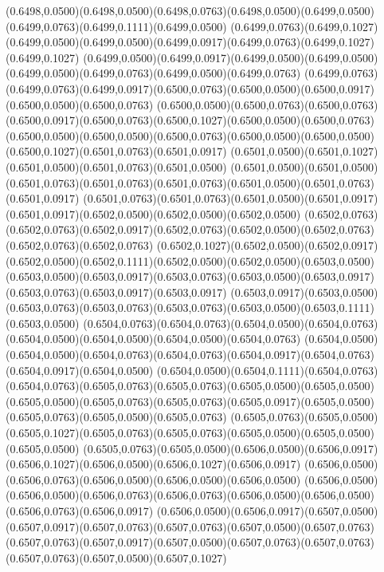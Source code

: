(0.6498,0.0500)(0.6498,0.0500)(0.6498,0.0763)(0.6498,0.0500)(0.6499,0.0500)(0.6499,0.0763)(0.6499,0.1111)(0.6499,0.0500)
(0.6499,0.0763)(0.6499,0.1027)(0.6499,0.0500)(0.6499,0.0500)(0.6499,0.0917)(0.6499,0.0763)(0.6499,0.1027)(0.6499,0.1027)
(0.6499,0.0500)(0.6499,0.0917)(0.6499,0.0500)(0.6499,0.0500)(0.6499,0.0500)(0.6499,0.0763)(0.6499,0.0500)(0.6499,0.0763)
(0.6499,0.0763)(0.6499,0.0763)(0.6499,0.0917)(0.6500,0.0763)(0.6500,0.0500)(0.6500,0.0917)(0.6500,0.0500)(0.6500,0.0763)
(0.6500,0.0500)(0.6500,0.0763)(0.6500,0.0763)(0.6500,0.0917)(0.6500,0.0763)(0.6500,0.1027)(0.6500,0.0500)(0.6500,0.0763)
(0.6500,0.0500)(0.6500,0.0500)(0.6500,0.0763)(0.6500,0.0500)(0.6500,0.0500)(0.6500,0.1027)(0.6501,0.0763)(0.6501,0.0917)
(0.6501,0.0500)(0.6501,0.1027)(0.6501,0.0500)(0.6501,0.0763)(0.6501,0.0500)
\PST@Solid(0.6501,0.0500)(0.6501,0.0500)(0.6501,0.0763)(0.6501,0.0763)(0.6501,0.0763)(0.6501,0.0500)(0.6501,0.0763)(0.6501,0.0917)
(0.6501,0.0763)(0.6501,0.0763)(0.6501,0.0500)(0.6501,0.0917)(0.6501,0.0917)(0.6502,0.0500)(0.6502,0.0500)(0.6502,0.0500)
(0.6502,0.0763)(0.6502,0.0763)(0.6502,0.0917)(0.6502,0.0763)(0.6502,0.0500)(0.6502,0.0763)(0.6502,0.0763)(0.6502,0.0763)
(0.6502,0.1027)(0.6502,0.0500)(0.6502,0.0917)(0.6502,0.0500)(0.6502,0.1111)(0.6502,0.0500)(0.6502,0.0500)(0.6503,0.0500)
(0.6503,0.0500)(0.6503,0.0917)(0.6503,0.0763)(0.6503,0.0500)(0.6503,0.0917)(0.6503,0.0763)(0.6503,0.0917)(0.6503,0.0917)
(0.6503,0.0917)(0.6503,0.0500)(0.6503,0.0763)(0.6503,0.0763)(0.6503,0.0763)(0.6503,0.0500)(0.6503,0.1111)(0.6503,0.0500)
(0.6504,0.0763)(0.6504,0.0763)(0.6504,0.0500)(0.6504,0.0763)(0.6504,0.0500)(0.6504,0.0500)(0.6504,0.0500)(0.6504,0.0763)
(0.6504,0.0500)(0.6504,0.0500)(0.6504,0.0763)(0.6504,0.0763)(0.6504,0.0917)(0.6504,0.0763)(0.6504,0.0917)(0.6504,0.0500)
(0.6504,0.0500)(0.6504,0.1111)(0.6504,0.0763)(0.6504,0.0763)(0.6505,0.0763)(0.6505,0.0763)(0.6505,0.0500)(0.6505,0.0500)
(0.6505,0.0500)(0.6505,0.0763)(0.6505,0.0763)(0.6505,0.0917)(0.6505,0.0500)(0.6505,0.0763)(0.6505,0.0500)(0.6505,0.0763)
(0.6505,0.0763)(0.6505,0.0500)(0.6505,0.1027)(0.6505,0.0763)(0.6505,0.0763)(0.6505,0.0500)(0.6505,0.0500)(0.6505,0.0500)
(0.6505,0.0763)(0.6505,0.0500)(0.6506,0.0500)(0.6506,0.0917)(0.6506,0.1027)(0.6506,0.0500)(0.6506,0.1027)(0.6506,0.0917)
(0.6506,0.0500)(0.6506,0.0763)(0.6506,0.0500)(0.6506,0.0500)(0.6506,0.0500)
\PST@Solid(0.6506,0.0500)(0.6506,0.0500)(0.6506,0.0763)(0.6506,0.0763)(0.6506,0.0500)(0.6506,0.0500)(0.6506,0.0763)(0.6506,0.0917)
(0.6506,0.0500)(0.6506,0.0917)(0.6507,0.0500)(0.6507,0.0917)(0.6507,0.0763)(0.6507,0.0763)(0.6507,0.0500)(0.6507,0.0763)
(0.6507,0.0763)(0.6507,0.0917)(0.6507,0.0500)(0.6507,0.0763)(0.6507,0.0763)(0.6507,0.0763)(0.6507,0.0500)(0.6507,0.1027)
